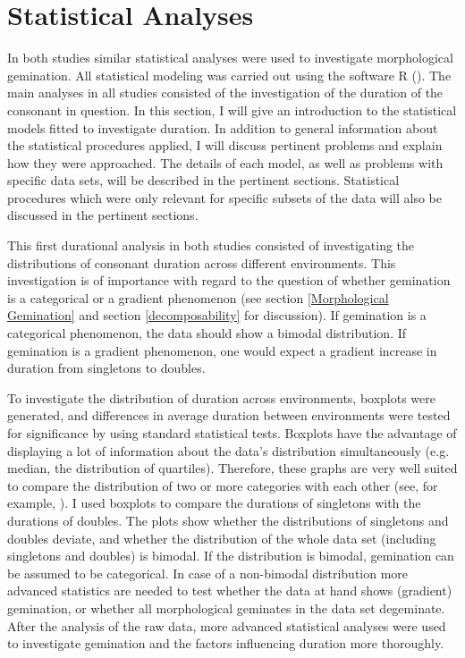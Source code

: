 \section{Statistical Analyses}\label{stats}

In both studies similar statistical analyses were used to investigate morphological gemination. All statistical modeling was carried out using the software R (\citealt{RDevelopmentCoreTeam.2014}). 
The main analyses in all studies consisted of the investigation of the duration of the consonant in question. 
In this section, I will give an introduction to the statistical models fitted to investigate duration. In addition to general information about the statistical procedures applied, I will discuss pertinent problems and explain how they were approached. The details of each model, as well as problems with specific data sets, will be described in the pertinent sections. Statistical procedures which were only relevant for specific subsets of the data will also be discussed in the pertinent sections. 




This first durational analysis in both studies consisted of investigating the distributions of consonant duration across different environments. This investigation is of importance with regard to the question of whether gemination is a categorical or a gradient phenomenon (see section \ref{Morphological Gemination} and section \ref{decomposability} for discussion). If gemination is a categorical phenomenon, the data should show a bimodal distribution. If gemination is a gradient phenomenon, one would expect a gradient increase in duration from singletons to doubles.

 To investigate the distribution of duration across environments, boxplots were generated, and differences in average duration between environments were tested for significance by using standard statistical tests. Boxplots have the advantage of displaying a lot of information about the data's distribution simultaneously (e.g. median, the distribution of quartiles). Therefore, these graphs are very well suited to compare the distribution of two or more categories with each other (see, for example, \citealt{Benjamini.1988}).  
 I used boxplots to compare the durations of singletons with the durations of doubles. The plots show whether the distributions of singletons and doubles deviate, and whether the distribution of the whole data set (including singletons and doubles) is bimodal. If the distribution is bimodal, gemination can be assumed to be categorical.
  In case of a non-bimodal distribution more advanced statistics are needed to test whether the data at hand shows (gradient) gemination, or whether all morphological geminates in the data set degeminate.
 After the analysis of the raw data, more advanced statistical analyses were used to investigate gemination and the factors influencing duration more thoroughly.


